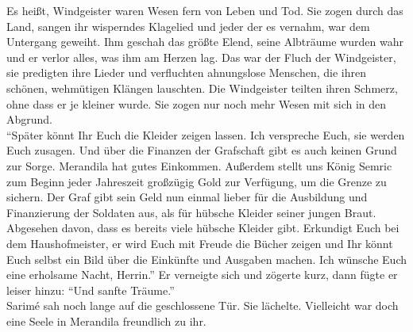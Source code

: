 Es heißt, Windgeister waren Wesen fern von Leben und Tod. Sie zogen durch das Land, sangen ihr 
wisperndes Klagelied und jeder der es vernahm, war dem Untergang geweiht. Ihm geschah das größte 
Elend, seine Albträume wurden wahr und er verlor alles, was ihm am Herzen lag. Das war der Fluch 
der Windgeister, sie predigten ihre Lieder und verfluchten ahnungslose Menschen, die ihren schönen, 
wehmütigen Klängen lauschten. Die Windgeister teilten ihren Schmerz, ohne dass er je kleiner wurde. 
Sie zogen nur noch mehr Wesen mit sich in den Abgrund.\\
``Später könnt Ihr Euch die Kleider zeigen lassen. Ich verspreche Euch, sie werden Euch zusagen. 
Und über die Finanzen der Grafschaft gibt es auch keinen Grund zur Sorge. Merandila hat gutes 
Einkommen. Außerdem stellt uns König Semric zum Beginn jeder Jahreszeit großzügig Gold zur 
Verfügung, um die Grenze zu sichern. Der Graf gibt sein Geld nun einmal lieber für die Ausbildung 
und Finanzierung der Soldaten aus, als für hübsche Kleider seiner jungen Braut. Abgesehen davon, 
dass es bereits viele hübsche Kleider gibt. Erkundigt Euch bei dem Haushofmeister, er wird Euch mit 
Freude die Bücher zeigen und Ihr könnt Euch selbst ein Bild über die Einkünfte und Ausgaben machen. 
Ich wünsche Euch eine erholsame Nacht, Herrin.'' Er verneigte sich und zögerte kurz, dann fügte er 
leiser hinzu: ``Und sanfte Träume.''\\
Sarimé sah noch lange auf die geschlossene Tür. Sie lächelte. Vielleicht war doch eine Seele in 
Merandila freundlich zu ihr. \\

